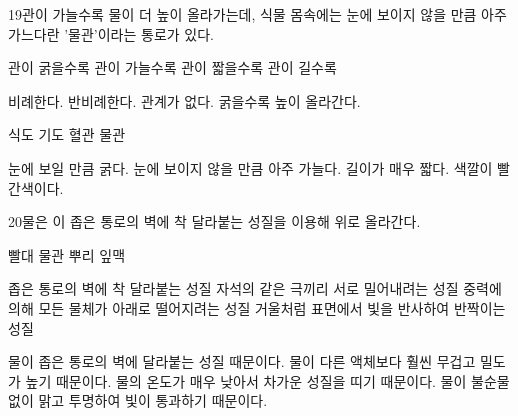 \documentclass[fs85,seriesRus]{korfarm-base}
\begin{document}
\begin{kfSentenceUnit}{19}{관이 가늘수록 물이 더 높이 올라가는데, 식물 몸속에는 눈에 보이지 않을 만큼 아주 가느다란 '물관'이라는 통로가 있다.}
\begin{kfChoices}
\kfChoice 관이 굵을수록
\kfChoice 관이 가늘수록
\kfChoice 관이 짧을수록
\kfChoice 관이 길수록
\end{kfChoices}
\begin{kfChoices}
\kfChoice 비례한다.
\kfChoice 반비례한다.
\kfChoice 관계가 없다.
\kfChoice 굵을수록 높이 올라간다.
\end{kfChoices}
\begin{kfChoices}
\kfChoice 식도
\kfChoice 기도
\kfChoice 혈관
\kfChoice 물관
\end{kfChoices}
\begin{kfChoices}
\kfChoice 눈에 보일 만큼 굵다.
\kfChoice 눈에 보이지 않을 만큼 아주 가늘다.
\kfChoice 길이가 매우 짧다.
\kfChoice 색깔이 빨간색이다.
\end{kfChoices}
\end{kfSentenceUnit}

\begin{kfSentenceUnit}{20}{물은 이 좁은 통로의 벽에 착 달라붙는 성질을 이용해 위로 올라간다.}
\begin{kfChoices}
\kfChoice 빨대
\kfChoice 물관
\kfChoice 뿌리
\kfChoice 잎맥
\end{kfChoices}
\begin{kfChoices}
\kfChoice 좁은 통로의 벽에 착 달라붙는 성질
\kfChoice 자석의 같은 극끼리 서로 밀어내려는 성질
\kfChoice 중력에 의해 모든 물체가 아래로 떨어지려는 성질
\kfChoice 거울처럼 표면에서 빛을 반사하여 반짝이는 성질
\end{kfChoices}
\begin{kfChoices}
\kfChoice 물이 좁은 통로의 벽에 달라붙는 성질 때문이다.
\kfChoice 물이 다른 액체보다 훨씬 무겁고 밀도가 높기 때문이다.
\kfChoice 물의 온도가 매우 낮아서 차가운 성질을 띠기 때문이다.
\kfChoice 물이 불순물 없이 맑고 투명하여 빛이 통과하기 때문이다.
\end{kfChoices}
\end{kfSentenceUnit}
\end{document}
